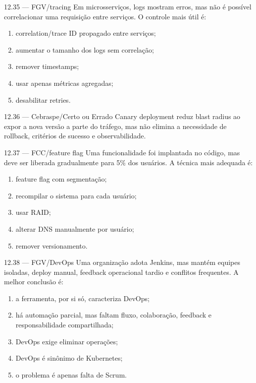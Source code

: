 \begin{questao}{ 12.35 — FGV/tracing}
Em microsserviços, logs mostram erros, mas não é possível correlacionar uma requisição entre serviços. O controle mais útil é:
\begin{enumerate}[label=\Alph*)]
\item correlation/trace ID propagado entre serviços;
\item aumentar o tamanho dos logs sem correlação;
\item remover timestamps;
\item usar apenas métricas agregadas;
\item desabilitar retries.
\end{enumerate}
\end{questao}

\begin{questao}{ 12.36 — Cebraspe/Certo ou Errado}
Canary deployment reduz blast radius ao expor a nova versão a parte do tráfego, mas não elimina a necessidade de rollback, critérios de sucesso e observabilidade.
\end{questao}

\begin{questao}{ 12.37 — FCC/feature flag}
Uma funcionalidade foi implantada no código, mas deve ser liberada gradualmente para 5\% dos usuários. A técnica mais adequada é:
\begin{enumerate}[label=\Alph*)]
\item feature flag com segmentação;
\item recompilar o sistema para cada usuário;
\item usar RAID;
\item alterar DNS manualmente por usuário;
\item remover versionamento.
\end{enumerate}
\end{questao}

\begin{questao}{ 12.38 — FGV/DevOps}
Uma organização adota Jenkins, mas mantém equipes isoladas, deploy manual, feedback operacional tardio e conflitos frequentes. A melhor conclusão é:
\begin{enumerate}[label=\Alph*)]
\item a ferramenta, por si só, caracteriza DevOps;
\item há automação parcial, mas faltam fluxo, colaboração, feedback e responsabilidade compartilhada;
\item DevOps exige eliminar operações;
\item DevOps é sinônimo de Kubernetes;
\item o problema é apenas falta de Scrum.
\end{enumerate}
\end{questao}

